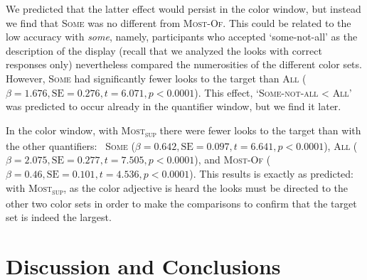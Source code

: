 \documentclass[output=paper]{langscibook}
\begin{document}
We predicted that the latter effect would persist in the color window, but instead we find that \textsc{Some} was no
different from \textsc{Most-Of}. This could be related to the low accuracy with \textit{some}, namely, participants who
accepted `some-not-all' as the description of the display (recall that we analyzed the looks with correct
responses only) nevertheless compared the numerosities of the different color sets. However, \textsc{Some} had
significantly fewer looks to the target than \textsc{All} ($\beta =1.676, \text{SE}=0.276, t=6.071,
p<0.0001$). This effect, `\textsc{Some-not-all} {\textless} \textsc{All}' was predicted to occur
already in the quantifier window, but we find it later.

In the color window, with \textsc{Most\textsubscript{sup}} there were fewer looks to the target than with the other
quantifiers: \ \textsc{Some} ($\beta =0.642, \text{SE}=0.097, t=6.641, p<0.0001$), \textsc{All}
($\beta =2.075, \text{SE}=0.277, t=7.505, p<0.0001$), and \textsc{Most-Of} ($\beta =0.46,
\text{SE}=0.101, t=4.536, p<0.0001$). This results is exactly as predicted: with
\textsc{Most\textsubscript{sup}}, as the color adjective is heard the looks must be directed to the other two
color sets in order to make the comparisons to confirm that the target set is indeed the largest.



\section{Discussion and Conclusions} 
\end{document}
